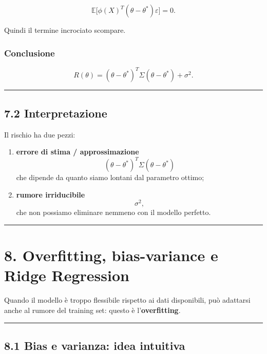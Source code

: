 \documentclass[
]{article}
\begin{document}
\[
\mathbb{E}\big[\phi(X)^T(\theta-\theta^*)\varepsilon\big]=0.
\]

Quindi il termine incrociato scompare.

\subsubsection{Conclusione}\label{conclusione-5}

\[
R(\theta)=
(\theta-\theta^*)^T\Sigma(\theta-\theta^*)+\sigma^2.
\]

\begin{center}\rule{0.5\linewidth}{0.5pt}\end{center}

\subsection{7.2 Interpretazione}\label{interpretazione-5}

Il rischio ha due pezzi:

\begin{enumerate}
\def\labelenumi{\arabic{enumi}.}
\item
  \textbf{errore di stima / approssimazione} \[
  (\theta-\theta^*)^T\Sigma(\theta-\theta^*)
  \] che dipende da quanto siamo lontani dal parametro ottimo;
\item
  \textbf{rumore irriducibile} \[
  \sigma^2,
  \] che non possiamo eliminare nemmeno con il modello perfetto.
\end{enumerate}

\begin{center}\rule{0.5\linewidth}{0.5pt}\end{center}

\section{8. Overfitting, bias-variance e Ridge
Regression}\label{overfitting-bias-variance-e-ridge-regression}

Quando il modello è troppo flessibile rispetto ai dati disponibili, può
adattarsi anche al rumore del training set: questo è
l'\textbf{overfitting}.

\begin{center}\rule{0.5\linewidth}{0.5pt}\end{center}

\subsection{8.1 Bias e varianza: idea
intuitiva}\label{bias-e-varianza-idea-intuitiva}
\end{document}
